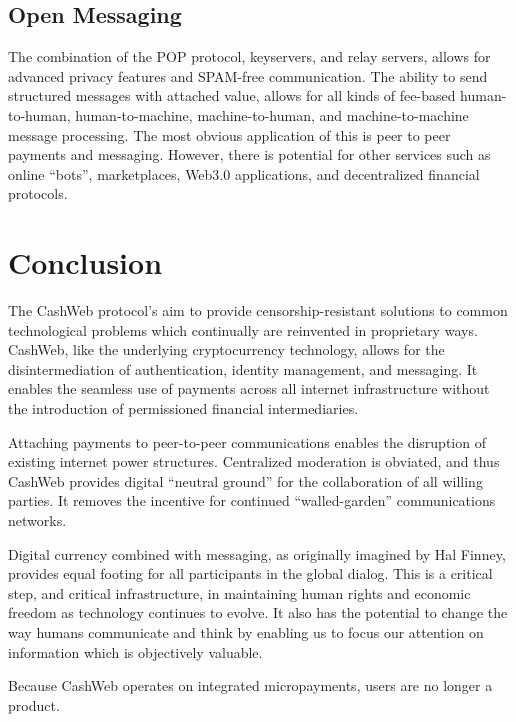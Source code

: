 \documentclass{article}
\begin{document}
\subsection{Open Messaging}

The combination of the POP protocol, keyservers, and relay servers, allows for advanced privacy features and SPAM-free communication. The ability to send structured messages with attached value, allows for all kinds of fee-based human-to-human, human-to-machine, machine-to-human, and machine-to-machine message processing. The most obvious application of this is peer to peer payments and messaging. However, there is potential for other services such as online ``bots'', marketplaces, Web3.0 applications, and decentralized financial protocols.

\section{Conclusion}

The CashWeb protocol's aim to provide censorship-resistant solutions to common technological problems which continually are reinvented in proprietary ways. CashWeb, like the underlying cryptocurrency technology, allows for the disintermediation of authentication, identity management, and messaging. It enables the seamless use of payments across all internet infrastructure without the introduction of permissioned financial intermediaries.

Attaching payments to peer-to-peer communications enables the disruption of existing internet power structures. Centralized moderation is obviated, and thus CashWeb provides digital ``neutral ground'' for the collaboration of all willing parties. It removes the incentive for continued ``walled-garden'' communications networks.

Digital currency combined with messaging, as originally imagined by Hal Finney\cite{finney2004rpow}, provides equal footing for all participants in the global dialog. This is a critical step, and critical infrastructure, in maintaining human rights and economic freedom as technology continues to evolve. It also has the potential to change the way humans communicate and think by enabling us to focus our attention on information which is objectively valuable.

Because CashWeb operates on integrated micropayments, users are no longer a product.



\end{document}
